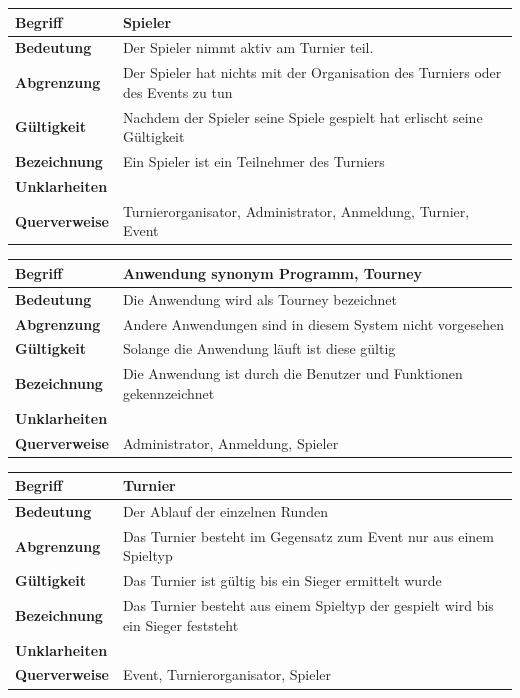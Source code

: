\documentclass[11pt]{article}
\begin{document}
\begin{tabularx}{\textwidth}{| p{} | p{} |}
	\hline
	\textbf{Begriff} & Spieler\\
	\hline
	\textbf{Bedeutung} & Der Spieler nimmt aktiv am Turnier teil.\\
	\hline
	\textbf{Abgrenzung} & Der Spieler hat nichts mit der Organisation des Turniers oder des Events zu tun\\
	\hline
	\textbf{Gültigkeit} & Nachdem der Spieler seine Spiele gespielt hat erlischt seine Gültigkeit\\
	\hline
	\textbf{Bezeichnung} & Ein Spieler ist ein Teilnehmer des Turniers\\
	\hline
	\textbf{Unklarheiten} & \\
	\hline
	\textbf{Querverweise} & Turnierorganisator, Administrator, Anmeldung, Turnier, Event \\
	\hline
\end{tabularx}

\begin{tabularx}{\textwidth}{| p{} | p{} |}
	\hline
	\textbf{Begriff} & Anwendung synonym Programm, Tourney\\
	\hline
	\textbf{Bedeutung} & Die Anwendung wird als Tourney bezeichnet\\
	\hline
	\textbf{Abgrenzung} & Andere Anwendungen sind in diesem System nicht vorgesehen\\
	\hline
	\textbf{Gültigkeit} & Solange die Anwendung läuft ist diese gültig\\
	\hline
	\textbf{Bezeichnung} & Die Anwendung ist durch die Benutzer und Funktionen gekennzeichnet\\
	\hline
	\textbf{Unklarheiten} & \\
	\hline
	\textbf{Querverweise} & Administrator, Anmeldung, Spieler \\
	\hline
\end{tabularx}

\begin{tabularx}{\textwidth}{| p{} | p{} |}
	\hline
	\textbf{Begriff} & Turnier\\
	\hline
	\textbf{Bedeutung} & Der Ablauf der einzelnen Runden\\
	\hline
	\textbf{Abgrenzung} & Das Turnier besteht im Gegensatz zum Event nur aus einem Spieltyp\\
	\hline
	\textbf{Gültigkeit} & Das Turnier ist gültig bis ein Sieger ermittelt wurde\\
	\hline
	\textbf{Bezeichnung} & Das Turnier besteht aus einem Spieltyp der gespielt wird bis ein Sieger feststeht\\
	\hline
	\textbf{Unklarheiten} & \\
	\hline
	\textbf{Querverweise} & Event, Turnierorganisator, Spieler \\
	\hline
\end{tabularx}
\end{document}
